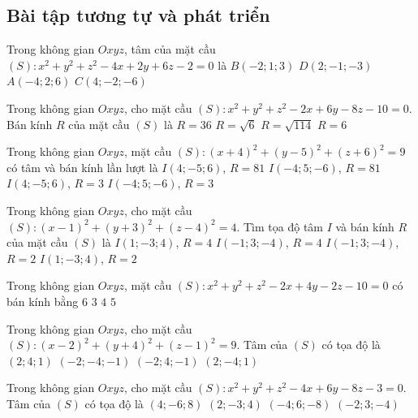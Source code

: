 \subsection{Bài tập tương tự và phát triển}
\begin{ex}%
	Trong không gian $Oxyz$, tâm của mặt cầu $(S)\colon x^2+y^2+z^2-4x+2y+6z-2=0$ là
	\choice
	{$B(-2;1;3)$}
	{\True $D(2;-1;-3)$}
	{$A(-4;2;6)$}
	{$C(4;-2;-6)$}
\end{ex}
\begin{ex}%
	Trong không gian $Oxyz$, cho mặt cầu $(S)\colon x^2+y^2+z^2-2x+6y-8z-10=0$. Bán kính $R$ của mặt cầu $(S)$ là
	\choice
	{$R=36$}
	{$R=\sqrt{6}$}
	{$R=\sqrt{114}$}
	{\True $R=6$}
\end{ex}
\begin{ex}%
	Trong không gian $Oxyz$, mặt cầu $(S)\colon (x+4)^2+(y-5)^2+(z+6)^2=9$ có tâm và bán kính lần lượt là
	\choice
	{$I(4;-5;6)$, $R=81$}
	{$I(-4;5;-6)$, $R=81$}
	{$I(4;-5;6)$, $R=3$}
	{\True $I(-4;5;-6)$, $R=3$}
\end{ex}
\begin{ex}%
	Trong không gian $Oxyz$, cho mặt cầu $(S)\colon (x-1)^2+(y+3)^2+(z-4)^2=4$. Tìm tọa độ tâm $I$ và bán kính $R$ của mặt cầu $(S)$ là
	\choice
	{$I(1;-3;4)$, $R=4$}
	{$I(-1;3;-4)$, $R=4$}
	{$I(-1;3;-4)$, $R=2$}
	{\True $I(1;-3;4)$, $R=2$}
\end{ex}
\begin{ex}%
	Trong không gian $Oxyz$, mặt cầu $(S)\colon x^2+y^2+z^2-2x+4y-2z-10=0$ có bán kính bằng
	\choice
	{$6$}
	{$3$}
	{\True $4$}
	{$5$}
\end{ex}
\begin{ex}%
	Trong không gian $Oxyz$, cho mặt cầu $(S)\colon (x-2)^2+(y+4)^2+(z-1)^2=9$. Tâm của $(S)$ có tọa độ là
	\choice
	{$(2;4;1)$}
	{$(-2;-4;-1)$}
	{$(-2;4;-1)$}
	{\True $(2;-4;1)$}
\end{ex}
\begin{ex}%
	Trong không gian $Oxyz$, cho mặt cầu $(S)\colon x^2+y^2+z^2-4x+6y-8z-3=0$. Tâm của $(S)$ có tọa độ là
	\choice
	{$(4;-6;8)$}
	{\True $(2;-3;4)$}
	{$(-4;6;-8)$}
	{$(-2;3;-4)$}
\end{ex}

